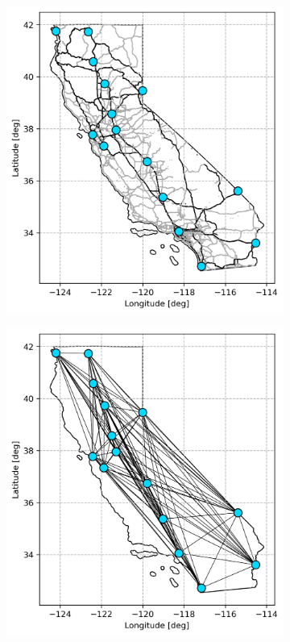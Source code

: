 \documentclass[11pt]{article}
\begin{document}
\begin{multicols}{2}
\begin{figure}[H]
	\centering
	\begin{subfigure}[t]{.5\linewidth}
		\centering\captionsetup{width = .8\linewidth}
		\includegraphics[width = \linewidth]{figs/full_graph.png}
	\end{subfigure}%
	\begin{subfigure}[t]{.5\linewidth}
		\centering\captionsetup{width = .8\linewidth}
		\includegraphics[width = \linewidth]{figs/reduced_graph.png}

\end{subfigure}
\end{figure}
\end{multicols}
\end{document}
